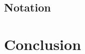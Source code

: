 \documentclass[mathserif,10pt]{beamer}
\begin{document}
\subsection{Notation}



\section{Conclusion}











\end{document}
